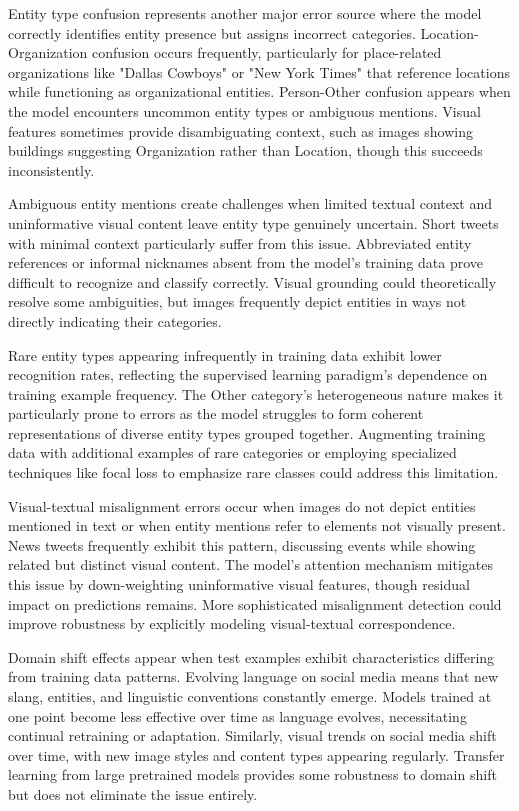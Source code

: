 \documentclass[12pt,a4paper]{report}
\begin{document}
Entity type confusion represents another major error source where the model correctly identifies entity presence but assigns incorrect categories. Location-Organization confusion occurs frequently, particularly for place-related organizations like "Dallas Cowboys" or "New York Times" that reference locations while functioning as organizational entities. Person-Other confusion appears when the model encounters uncommon entity types or ambiguous mentions. Visual features sometimes provide disambiguating context, such as images showing buildings suggesting Organization rather than Location, though this succeeds inconsistently.

Ambiguous entity mentions create challenges when limited textual context and uninformative visual content leave entity type genuinely uncertain. Short tweets with minimal context particularly suffer from this issue. Abbreviated entity references or informal nicknames absent from the model's training data prove difficult to recognize and classify correctly. Visual grounding could theoretically resolve some ambiguities, but images frequently depict entities in ways not directly indicating their categories.

Rare entity types appearing infrequently in training data exhibit lower recognition rates, reflecting the supervised learning paradigm's dependence on training example frequency. The Other category's heterogeneous nature makes it particularly prone to errors as the model struggles to form coherent representations of diverse entity types grouped together. Augmenting training data with additional examples of rare categories or employing specialized techniques like focal loss to emphasize rare classes could address this limitation.

Visual-textual misalignment errors occur when images do not depict entities mentioned in text or when entity mentions refer to elements not visually present. News tweets frequently exhibit this pattern, discussing events while showing related but distinct visual content. The model's attention mechanism mitigates this issue by down-weighting uninformative visual features, though residual impact on predictions remains. More sophisticated misalignment detection could improve robustness by explicitly modeling visual-textual correspondence.

Domain shift effects appear when test examples exhibit characteristics differing from training data patterns. Evolving language on social media means that new slang, entities, and linguistic conventions constantly emerge. Models trained at one point become less effective over time as language evolves, necessitating continual retraining or adaptation. Similarly, visual trends on social media shift over time, with new image styles and content types appearing regularly. Transfer learning from large pretrained models provides some robustness to domain shift but does not eliminate the issue entirely.
\end{document}
